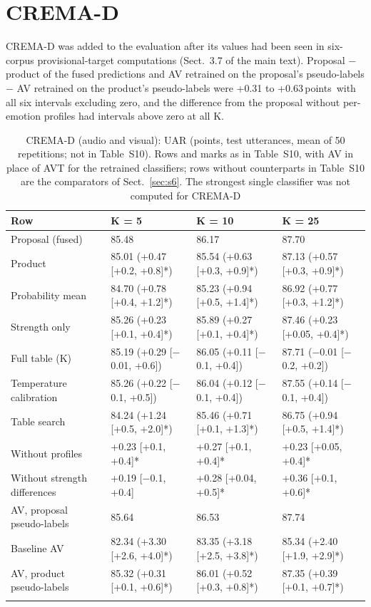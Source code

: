 \documentclass[sn-nature,pdflatex]{sn-jnl}
\newcommand{\pt}{\,points}
\begin{document}
\section{CREMA-D}\label{sec:s7}
CREMA-D was added to the evaluation after its values had been seen in six-corpus provisional-target computations (Sect.~3.7 of the main text). Proposal $-$ product of the fused predictions and AV retrained on the proposal's pseudo-labels $-$ AV retrained on the product's pseudo-labels were +0.31 to +0.63\pt\ with all six intervals excluding zero, and the difference from the proposal without per-emotion profiles had intervals above zero at all K.

\begin{table}[h]
\caption{CREMA-D (audio and visual): UAR (points, test utterances, mean of 50 repetitions; not in Table~S10). Rows and marks as in Table~S10, with AV in place of AVT for the retrained classifiers; rows without counterparts in Table~S10 are the comparators of Sect.~\ref{sec:s6}. The strongest single classifier was not computed for CREMA-D}\label{tab:s3}
\footnotesize\setlength{\tabcolsep}{1pt}
\begin{tabular}{@{}p{2.2cm}lll@{}}
\toprule
Row & K = 5 & K = 10 & K = 25 \\
\midrule
Proposal (fused) & 85.48 & 86.17 & 87.70 \\
Product & 85.01 (+0.47 [+0.2, +0.8]*) & 85.54 (+0.63 [+0.3, +0.9]*) & 87.13 (+0.57 [+0.3, +0.9]*) \\
Probability mean & 84.70 (+0.78 [+0.4, +1.2]*) & 85.23 (+0.94 [+0.5, +1.4]*) & 86.92 (+0.77 [+0.3, +1.2]*) \\
Strength only & 85.26 (+0.23 [+0.1, +0.4]*) & 85.89 (+0.27 [+0.1, +0.4]*) & 87.46 (+0.23 [+0.05, +0.4]*) \\
Full table (K) & 85.19 (+0.29 [$-$0.01, +0.6]) & 86.05 (+0.11 [$-$0.1, +0.4]) & 87.71 ($-$0.01 [$-$0.2, +0.2]) \\
Temperature calibration & 85.26 (+0.22 [$-$0.1, +0.5]) & 86.04 (+0.12 [$-$0.1, +0.4]) & 87.55 (+0.14 [$-$0.1, +0.4]) \\
Table search & 84.24 (+1.24 [+0.5, +2.0]*) & 85.46 (+0.71 [+0.1, +1.3]*) & 86.75 (+0.94 [+0.5, +1.4]*) \\
Without profiles & +0.23 [+0.1, +0.4]* & +0.27 [+0.1, +0.4]* & +0.23 [+0.05, +0.4]* \\
Without strength differences & +0.19 [$-$0.1, +0.4] & +0.28 [+0.04, +0.5]* & +0.36 [+0.1, +0.6]* \\
AV, proposal pseudo-labels & 85.64 & 86.53 & 87.74 \\
Baseline AV & 82.34 (+3.30 [+2.6, +4.0]*) & 83.35 (+3.18 [+2.5, +3.8]*) & 85.34 (+2.40 [+1.9, +2.9]*) \\
AV, product pseudo-labels & 85.32 (+0.31 [+0.1, +0.6]*) & 86.01 (+0.52 [+0.3, +0.8]*) & 87.35 (+0.39 [+0.1, +0.7]*) \\

\botrule
\end{tabular}
\end{table}
\end{document}
